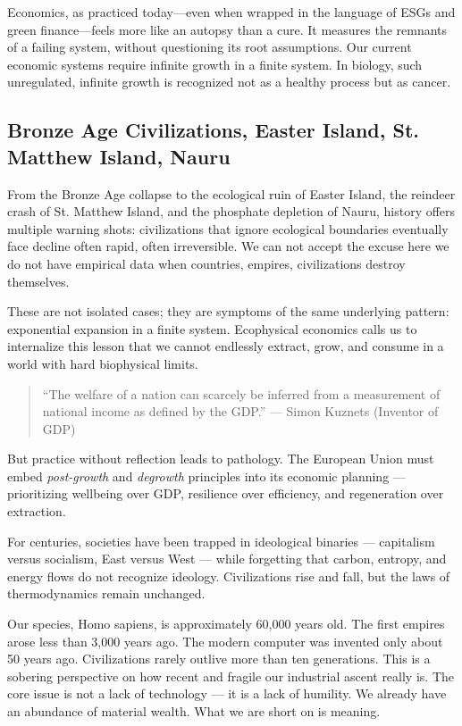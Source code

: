 \documentclass[a4paper,12pt]{article}
\begin{document}
Economics, as practiced today—even when wrapped in the language of ESGs and green finance—feels more like an autopsy than a cure. It measures the remnants of a failing system, without questioning its root assumptions. Our current economic systems require infinite growth in a finite system. In biology, such unregulated, infinite growth is recognized not as a healthy process but as cancer.

\subsection{Bronze Age Civilizations, Easter Island, St. Matthew Island, Nauru}

From the Bronze Age collapse to the ecological ruin of Easter Island, the reindeer crash of St. Matthew Island, and the phosphate depletion of Nauru, history offers multiple warning shots: civilizations that ignore ecological boundaries eventually face decline often rapid, often irreversible. We can not accept the excuse here we do not have empirical data when countries, empires, civilizations destroy themselves.

These are not isolated cases; they are symptoms of the same underlying pattern: exponential expansion in a finite system. Ecophysical economics calls us to internalize this lesson that we cannot endlessly extract, grow, and consume in a world with hard biophysical limits.

\begin{quote}
“The welfare of a nation can scarcely be inferred from a measurement of national income as defined by the GDP.”
— Simon Kuznets (Inventor of GDP)
\end{quote}

But practice without reflection leads to pathology. The European Union must embed \textit{post-growth} and \textit{degrowth} principles into its economic planning — prioritizing wellbeing over GDP, resilience over efficiency, and regeneration over extraction.

For centuries, societies have been trapped in ideological binaries — capitalism versus socialism, East versus West — while forgetting that carbon, entropy, and energy flows do not recognize ideology. Civilizations rise and fall, but the laws of thermodynamics remain unchanged.

Our species, Homo sapiens, is approximately 60,000 years old. The first empires arose less than 3,000 years ago. The modern computer was invented only about 50 years ago. Civilizations rarely outlive more than ten generations. This is a sobering perspective on how recent and fragile our industrial ascent really is. The core issue is not a lack of technology — it is a lack of humility. We already have an abundance of material wealth. What we are short on is meaning.
\end{document}
